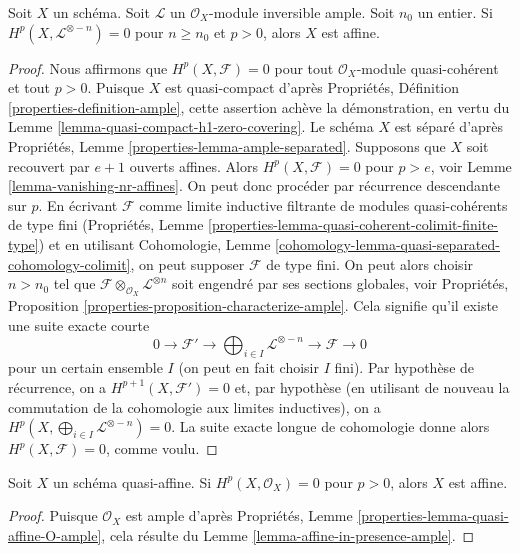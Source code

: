 \begin{lemma}
\label{lemma-affine-in-presence-ample}
Soit $X$ un schéma. Soit $\mathcal{L}$ un
$\mathcal{O}_X$-module inversible ample. Soit $n_0$ un entier.
Si $H^p(X, \mathcal{L}^{\otimes -n}) = 0$ pour $n \geq n_0$ et $p > 0$,
alors $X$ est affine.
\end{lemma}

\begin{proof}
Nous affirmons que $H^p(X, \mathcal{F}) = 0$ pour tout
$\mathcal{O}_X$-module quasi-cohérent et tout $p > 0$. Puisque $X$ est quasi-compact
d'après Propriétés, Définition \ref{properties-definition-ample},
cette assertion achève la démonstration,
en vertu du Lemme \ref{lemma-quasi-compact-h1-zero-covering}.
Le schéma $X$ est séparé d'après
Propriétés, Lemme \ref{properties-lemma-ample-separated}.
Supposons que $X$ soit recouvert par $e + 1$ ouverts affines. Alors
$H^p(X, \mathcal{F}) = 0$ pour $p > e$, voir
Lemme \ref{lemma-vanishing-nr-affines}. On peut donc procéder par récurrence
descendante sur $p$. En écrivant $\mathcal{F}$
comme limite inductive filtrante de modules quasi-cohérents
de type fini (Propriétés, Lemme
\ref{properties-lemma-quasi-coherent-colimit-finite-type})
et en utilisant Cohomologie, Lemme
\ref{cohomology-lemma-quasi-separated-cohomology-colimit},
on peut supposer $\mathcal{F}$ de type fini.
On peut alors choisir $n > n_0$ tel que
$\mathcal{F} \otimes_{\mathcal{O}_X} \mathcal{L}^{\otimes n}$
soit engendré par ses sections globales, voir Propriétés, Proposition
\ref{properties-proposition-characterize-ample}.
Cela signifie qu'il existe une suite exacte courte
$$
0 \to \mathcal{F}' \to
\bigoplus\nolimits_{i \in I} \mathcal{L}^{\otimes -n}
\to \mathcal{F} \to 0
$$
pour un certain ensemble $I$ (on peut en fait choisir $I$ fini). Par
hypothèse de récurrence, on a $H^{p + 1}(X, \mathcal{F}') = 0$
et, par hypothèse (en utilisant de nouveau la commutation
de la cohomologie aux limites inductives),
on a $H^p(X, \bigoplus_{i \in I} \mathcal{L}^{\otimes -n}) = 0$.
La suite exacte longue de cohomologie donne alors
$H^p(X, \mathcal{F}) = 0$, comme voulu.
\end{proof}

\begin{lemma}
\label{lemma-affine-if-quasi-affine}
Soit $X$ un schéma quasi-affine.
Si $H^p(X, \mathcal{O}_X) = 0$ pour $p > 0$,
alors $X$ est affine.
\end{lemma}

\begin{proof}
Puisque $\mathcal{O}_X$ est ample d'après
Propriétés, Lemme \ref{properties-lemma-quasi-affine-O-ample},
cela résulte du Lemme \ref{lemma-affine-in-presence-ample}.
\end{proof}







